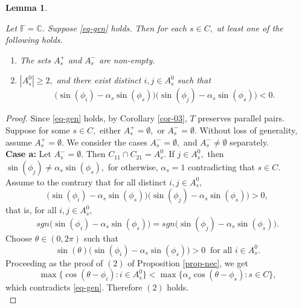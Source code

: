 \documentclass{amsart}
\newtheorem{lemma}[theorem]{Lemma}
\theoremstyle{definition}
\theoremstyle{remark}
\numberwithin{equation}{section}
\begin{document}
\begin{lemma}\label{lem-gen}
	
	Let $\mathbb{F}=\mathbb{C}.$ Suppose   \eqref{eq-gen} holds. Then  for each  $s\in C,$ at least one  of the following holds.
	\begin{enumerate}
		\item The sets	$A_s^+$ and  $A_s^-$ are non-empty.
		\item   $|A_s^0|\geq 2,$ and there exist distinct $i,j\in  A_s^0$ such that $$\Big(\sin(\phi_i)-\alpha_s\sin(\phi_s)\Big)\Big(\sin(\phi_j)-\alpha_s\sin(\phi_s)\Big)<0.$$
	\end{enumerate}
\end{lemma}
\begin{proof}
	Since  \eqref{eq-gen} holds, by Corollary \ref{cor-03}, $T$ preserves parallel pairs. %
	Suppose for some $s\in  C,$ either $A_s^+=\emptyset,$ or $A_s^-=\emptyset.$	Without loss of generality, assume $A_s^+=\emptyset.$  We consider the cases $A_s^-=\emptyset,$ and $A_s^-\neq \emptyset$ separately. \\
	
	\textbf{Case a:} Let  $A_s^-=\emptyset.$ Then $C_{11}\cap C_{21}=A_s^0.$ %
	 If $j\in A_s^0,$ then $\sin(\phi_j)\neq \alpha_s\sin(\phi_s),$ for otherwise, $\alpha_s=1$ contradicting that $s\in C.$ Assume to the contrary that 
	for all distinct $i,j\in  A_s^0,$  $$\Big(\sin(\phi_i)-\alpha_s\sin(\phi_s)\Big)\Big(\sin(\phi_j)-\alpha_s\sin(\phi_s)\Big)>0,$$ that is, for all $i,j\in A_s^0,$
	\[sgn\Big(\sin(\phi_i)-\alpha_s\sin(\phi_s)\Big)=sgn\Big(\sin(\phi_j)-\alpha_s\sin(\phi_s)\Big).\]
	Choose $\theta\in(0,2\pi)$ such that $$\sin(\theta)\Big(\sin(\phi_i)-\alpha_s\sin(\phi_s)\Big)>0 ~\text{ for all } i\in  A_s^0.$$ Proceeding as the proof of $(2)$ of Proposition \ref{prop-nec}, we get 
	\[ \max\{ \cos(\theta-\phi_i):i\in A_s^0\}< \max \{\alpha_s\cos(\theta-\phi_s):s\in C\},\]
	which contradicts \eqref{eq-gen}. Therefore $(2)$ holds.\\
	

\end{proof}
\end{document}
